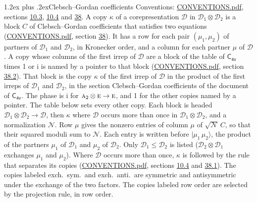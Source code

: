 \documentclass[10pt,a4paper]{article}
\makeatletter
\renewcommand\section{\@startsection{section}{1}{\z@}{-3ex plus -1ex minus -.2ex}%
  {1.2ex plus .2ex}{\normalfont\large\sffamily\bfseries\color{parttitle}}}
\numberwithin{equation}{section}
\newcommand{\grp}[1]{\mathsf{#1}}
\newcommand{\irr}[1]{\text{\normalfont\scshape #1}}
\newcommand{\iunit}{\mathrm{i}}
\newcommand{\irrprod}{\otimes}
\newcommand{\mult}{\kappa}
\newcommand{\intx}{\mu}
\newcommand{\cgnorm}{\mathcal{N}}
\newcommand{\prodket}[2]{\lvert {#1}\,{#2}\rangle}
\makeatother
\begin{document}
\section{Clebsch--Gordan coefficients}\label{s:clebsch_gordan}
Conventions: \href{../../CONVENTIONS.pdf}{CONVENTIONS.pdf}, sections \href{../../../rotation/CONVENTIONS.pdf\#conv.10.3}{10.3}, \href{../../../rotation/CONVENTIONS.pdf\#conv.10.4}{10.4} and \href{../../CONVENTIONS.pdf\#conv.38}{38}.
\leavevmode\label{n:index.copy}\label{n:matrix.cg.stored}A copy $\mult$ of a corepresentation $\mathcal{D}$ in $\mathcal{D}_1\irrprod\mathcal{D}_2$ is a block $C$ of Clebsch--Gordan coefficients that satisfies two equations (\href{../../CONVENTIONS.pdf}{CONVENTIONS.pdf}, section \href{../../CONVENTIONS.pdf\#conv.38}{38}). \label{n:index.cg}It has a row for each pair $(\intx_1, \intx_2)$ of partners of $\mathcal{D}_1$ and $\mathcal{D}_2$, in Kronecker order, and a column for each partner $\intx$ of $\mathcal{D}$.
A copy whose columns of the first irrep of $\mathcal{D}$ are a block of the table of $\grp{C_{4v}}$ times 1 or $\iunit$ is named by a pointer to that block (\href{../../CONVENTIONS.pdf}{CONVENTIONS.pdf}, section \href{../../CONVENTIONS.pdf\#conv.38.2}{38.2}). That block is the copy $\mult$ of the first irrep of $\mathcal{D}$ in the product of the first irreps of $\mathcal{D}_1$ and $\mathcal{D}_2$, in the section Clebsch--Gordan coefficients of the document of \href{../../../rotation/data/pdf/C4v.pdf}{$\grp{C_{4v}}$}. The phase is $\iunit$ for $\irr{a}_{2}\irrprod \irr{e}\to \irr{e}$, and 1 for the other copies named by a pointer. The table below sets every other copy.
Each block is headed $\mathcal{D}_1\irrprod\mathcal{D}_2\to\mathcal{D}$, then $\mult$ where $\mathcal{D}$ occurs more than once in $\mathcal{D}_1\irrprod\mathcal{D}_2$, and a normalization $\cgnorm$. Row $\intx$ gives the nonzero entries of column $\intx$ of $\sqrt{\cgnorm}\,C$, so that their squared moduli sum to $\cgnorm$. \label{n:vector.ket.product}Each entry is written before $\prodket{\intx_1}{\intx_2}$, the product of the partners $\intx_1$ of $\mathcal{D}_1$ and $\intx_2$ of $\mathcal{D}_2$. Only $\mathcal{D}_1 \le \mathcal{D}_2$ is listed ($\mathcal{D}_2\irrprod\mathcal{D}_1$ exchanges $\intx_1$ and $\intx_2$).
Where $\mathcal{D}$ occurs more than once, $\mult$ is followed by the rule that separates its copies (\href{../../CONVENTIONS.pdf}{CONVENTIONS.pdf}, sections \href{../../../rotation/CONVENTIONS.pdf\#conv.10.4}{10.4} and \href{../../CONVENTIONS.pdf\#conv.38.1}{38.1}). \label{n:abbreviation.exchange}The copies labeled exch.\ sym.\ and exch.\ anti.\ are symmetric and antisymmetric under the exchange of the two factors. The copies labeled row order are selected by the projection rule, in row order.
\end{document}
